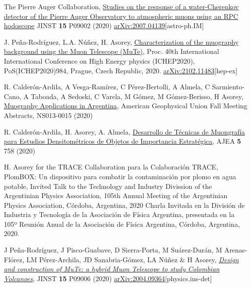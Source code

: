 \begin{etaremune}
\item {}The Pierre Auger Collaboration, \href{https://doi.org/10.1088/1748-0221/15/09/P09002}{Studies on the response of a water-Cherenkov detector of the Pierre Auger Observatory to atmospheric muons using an RPC hodoscope} JINST {\bf{15}} P09002 (2020) \href{https://arxiv.org/abs/2007.04139}{arXiv:2007.04139}[astro-ph.IM]

\item {} J. Peña-Rodríguez, L.A. Núñez, H. Asorey, \href{https://doi.org/10.22323/1.390.0984}{Characterization of the muography background using the Muon Telescope (MuTe)}, \en Proc. 40th International International Conference on High Energy physics (ICHEP2020), PoS(ICHEP2020)984, Prague,  Czech Republic, 2020. \href{http://arxiv.org/abs/2102.11483}{arXiv:2102.11483}[hep-ex]

\item {} R. Calderón-Ardila, A Vesga-Ramírez, C Pérez-Bertolli, A Almela, C Sarmiento-Cano, A Taboada, A Sedoski, C Varela, M Gómez, M Gómez-Berisso, H Asorey, \href{https://ui.adsabs.harvard.edu/abs/2020AGUFMNS0130015C/abstract}{Muography Applications in Argentina}, American Geophysical Union Fall Meeting Abstracts, NS013-0015 (2020)

\item {} R. Calderón-Ardila, H. Asorey, A. Almela, \href{https://doi.org/10.33414/ajea.5.758.2020}{Desarrollo de Técnicas de Muongrafía para Estudios Densitométricos de Objetos de Importancia Estratégica}, AJEA {\bf{5}} 758 (2020)

\item {} H. Asorey \ifeng for the TRACE Collaboration \else para la Colaboración TRACE\fi, PlomBOX: Un dispositivo para combatir la contaminación por plomo en agua potable, \ifeng Invited Talk to the Technology and Industry Divission of the Argentinian Physics Association, 105th Annual Meeting of the Argentinian Physics Association, Córdoba, Argentina, 2020 \else Charla Invitada en la División de Industria y Tecnología de la Asociación de Física Argentina, presentada en la 105º Reunión Anual de la Asociación de Física Argentina, Córdoba, Argentina, 2020.\fi

\item {} J Peña-Rodríguez, J Pisco-Guabave, D Sierra-Porta, M Suárez-Durán, M Arenas-Flórez, LM Pérez-Archila, JD Sanabria-Gómez, LA Núñez \& H Asorey, \href{https://doi.org/10.1088/1748-0221/15/09/P09006}{\emph{Design and construction of MuTe: a hybrid Muon Telescope to study Colombian Volcanoes}}, JINST {\bf{15}} P09006 (2020) \href{https://arxiv.org/abs/2004.09364}{arXiv:2004.09364}[physics.ins-det]


\end{etaremune}
